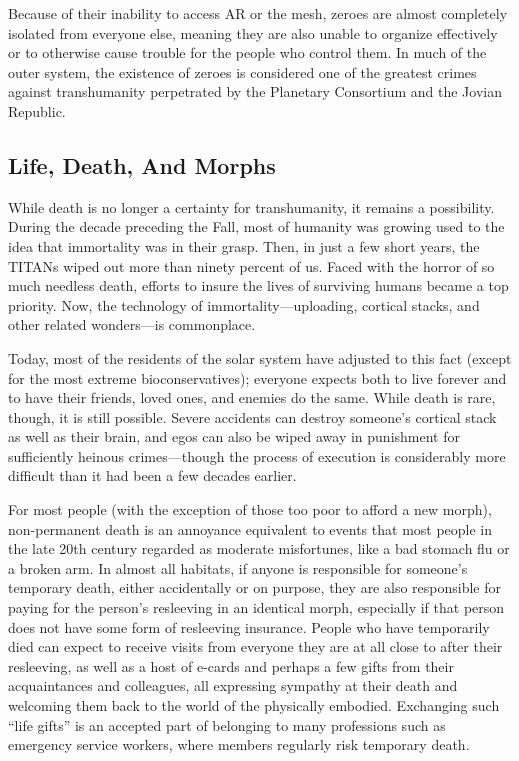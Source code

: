 Because of their inability to access AR or the mesh, 
zeroes are almost completely isolated from everyone 
else, meaning they are also unable to organize effectively or to otherwise cause trouble for the people 
who control them. In much of the outer system, the 
existence of zeroes is considered one of the greatest 
crimes against transhumanity perpetrated by the Planetary Consortium and the Jovian Republic.

\subsection{Life, Death, And Morphs}

While death is no longer a certainty for transhumanity, 
it remains a possibility. During the decade preceding 
the Fall, most of humanity was growing used to the 
idea that immortality was in their grasp. Then, in just 
a few short years, the TITANs wiped out more than 
ninety percent of us. Faced with the horror of so much 
needless death, efforts to insure the lives of surviving 
humans became a top priority. Now, the technology 
of immortality—uploading, cortical stacks, and other 
related wonders—is commonplace.

Today, most of the residents of the solar system 
have adjusted to this fact (except for the most extreme 
bioconservatives); everyone expects both to live forever 
and to have their friends, loved ones, and enemies do 
the same. While death is rare, though, it is still possible. 
Severe accidents can destroy someone's cortical stack 
as well as their brain, and egos can also be wiped away 
in punishment for sufficiently heinous crimes—though 
the process of execution is considerably more difficult 
than it had been a few decades earlier.

For most people (with the exception of those too 
poor to afford a new morph), non-permanent death is 
an annoyance equivalent to events that most people in 
the late 20th century regarded as moderate misfortunes, 
like a bad stomach flu or a broken arm. In almost all 
habitats, if anyone is responsible for someone's temporary death, either accidentally or on purpose, they are 
also responsible for paying for the person's resleeving 
in an identical morph, especially if that person does not 
have some form of resleeving insurance. People who 
have temporarily died can expect to receive visits from 
everyone they are at all close to after their resleeving, 
as well as a host of e-cards and perhaps a few gifts 
from their acquaintances and colleagues, all expressing 
sympathy at their death and welcoming them back to 
the world of the physically embodied. Exchanging such 
``life gifts'' is an accepted part of belonging to many 
professions such as emergency service workers, where 
members regularly risk temporary death.

